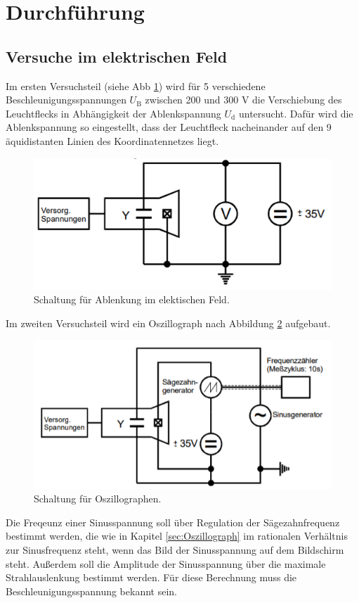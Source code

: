 \section{Durchführung}
\label{sec:Durchführung}

\subsection{Versuche im elektrischen Feld}

Im ersten Versuchsteil (siehe Abb \ref{fig:V1}) wird für 5 verschiedene Beschleunigungsspannungen $U_\text{B}$ zwischen 200 und 300 V die Verschiebung des Leuchtflecks in Abhängigkeit der Ablenkspannung $U_\text{d}$ untersucht.
Dafür wird die Ablenkspannung so eingestellt, dass der Leuchtfleck nacheinander auf den 9 äquidistanten Linien des Koordinatennetzes liegt.
\begin{figure}
  \centering
  \includegraphics{data/V1.png}
  \caption{Schaltung für Ablenkung im elektischen Feld.}
  \label{fig:V1}
\end{figure}

Im zweiten Versuchsteil wird ein Oszillograph nach Abbildung \ref{fig:V2} aufgebaut.
\begin{figure}
  \centering
  \includegraphics{data/V2.png}
  \caption{Schaltung für Oszillographen.}
  \label{fig:V2}
\end{figure}
Die Freqeunz einer Sinusspannung soll über Regulation der Sägezahnfrequenz bestimmt werden, die wie in Kapitel \ref{sec:Oszillograph} im rationalen Verhältnis zur Sinusfrequenz steht, wenn das Bild der Sinusspannung auf dem Bildschirm steht.
Außerdem soll die Amplitude der Sinusspannung über die maximale Strahlauslenkung bestimmt werden.
Für diese Berechnung muss die Beschleunigungsspannung bekannt sein.

